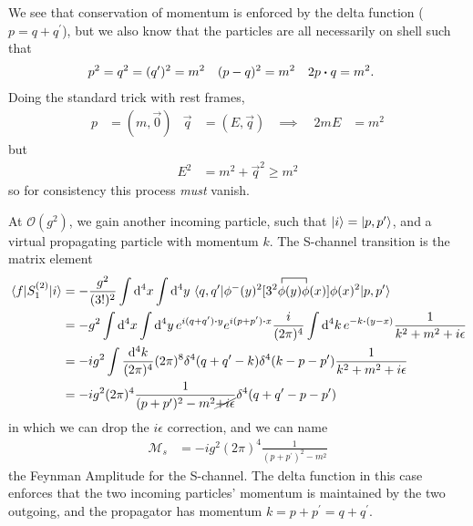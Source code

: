 \documentclass[notes.tex]{subfiles}
\begin{document}
We see that conservation of momentum is enforced by the delta function ($p = q + q^\prime$), but we also know that the particles are all necessarily on shell such that
\begin{align*}
	p^2 = q^2 &= (q^\prime)^2 = m^2&
	(p-q)^2 &= m^2&
	2p\vdot q &= m^2.
\end{align*}
Doing the standard trick with rest frames,
\begin{align*}
	p &= (m, \vec{0}) & \vec{q} &= (E, \vec{q}) & \implies \quad 2mE&= m^2
\end{align*}
but
\begin{align*}
	E^2 &= m^2 + \vec{q}^2 \geq m^2
\end{align*}
so for consistency this process \emph{must} vanish.

At $\mathcal{O}(g^2)$, we gain another incoming particle, such that $\ket{i} = \ket{p, p^\prime}$, and a virtual propagating particle with momentum $k$.
The S-channel transition is the matrix element
\begin{align*}
	\mel{f}{S_1^{(2)}}{i} &= -\frac{g^2}{(3!)^2} \int \dd[4]{x} \int \dd[4]{y} \mel{q, q^\prime}{\phi^-(y)^2[3^2\contraction{}{\phi}{(y)}{\phi}\phi(y)\phi(x)]\phi(x)^2}{p, p^\prime}\\
	&= -g^2 \int \dd[4]{x} \int \dd[4]{y} e^{i(q+q^\prime)\vdot{y}}e^{i(p+p^\prime)\vdot{x}} \frac{i}{(2\pi)^4}\int\dd[4]{k} e^{-k\vdot(y-x)}\frac{1}{k^2 + m^2 + i\epsilon}\\
	&= -ig^2\int \frac{\dd[4]{k}}{(2\pi)^4} (2\pi)^8 \delta^4(q + q^\prime - k) \delta^4(k-p-p^\prime)\frac{1}{k^2 + m^2 + i\epsilon}\\
	&= -ig^2 (2\pi)^4 \frac{1}{(p+p^\prime)^2 - m^2 \cancel{+i\epsilon}} \delta^4(q+q^\prime - p - p^\prime)
\end{align*}
in which we can drop the $i\epsilon$ correction, and we can name
\begin{align*}
	\mathcal{M}_s &= -ig^2 (2\pi)^4 \frac{1}{(p+p^\prime)^2 - m^2}
\end{align*}
the Feynman Amplitude for the S-channel.
The delta function in this case enforces that the two incoming particles' momentum is maintained by the two outgoing, and the propagator has momentum $k = p+ p^\prime = q + q^\prime$.
\end{document}
